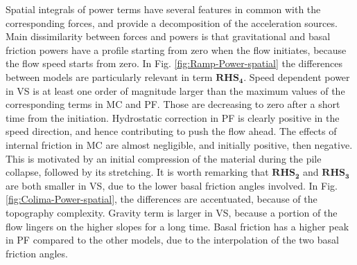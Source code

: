 \documentclass{article}
\begin{document}
Spatial integrals of power terms have several features in common with the corresponding forces, and provide a decomposition of the acceleration sources. Main dissimilarity between forces and powers is that gravitational and basal friction powers have a profile starting from zero when the flow initiates, because the flow speed starts from zero. In Fig. \ref{fig:Ramp-Power-spatial} the differences between models are particularly relevant in term  $\boldsymbol{RHS_4}$. Speed dependent power in VS is at least one order of magnitude larger than the maximum values of the corresponding terms in MC and PF. Those are decreasing to zero after a short time from the initiation. Hydrostatic correction in PF is clearly positive in the speed direction, and hence contributing to push the flow ahead. The effects of internal friction in MC are almost negligible, and initially positive, then negative. This is motivated by an initial compression of the material during the pile collapse, followed by its stretching. It is worth remarking that $\boldsymbol{RHS_2}$ and $\boldsymbol{RHS_3}$ are both smaller in VS, due to the lower basal friction angles involved. In Fig. \ref{fig:Colima-Power-spatial}, the differences are accentuated, because of the topography complexity. Gravity term is larger in VS, because a portion of the flow lingers on the higher slopes for a long time. Basal friction has a higher peak in PF compared to the other models, due to the interpolation of the two basal friction angles.
\end{document}
